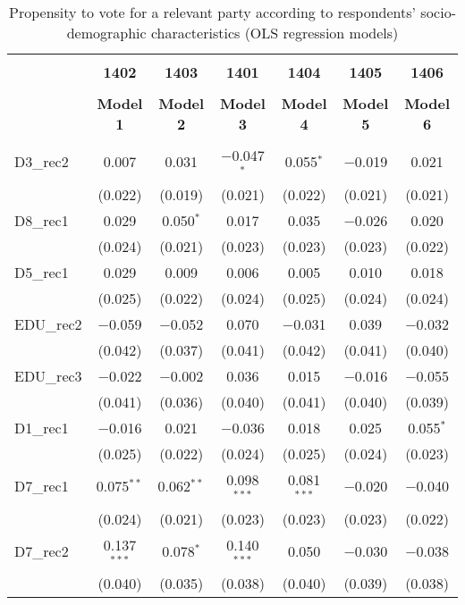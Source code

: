 \documentclass[
]{article}
\begin{document}
\begin{table}[!htbp] \centering 
  \caption{Propensity to vote for a relevant party according to respondents' 
                     socio-demographic characteristics (OLS regression models)} 
  \label{table:full_ols_ie} 
\begin{tabular}{@{\extracolsep{5pt}}lcccccc} 
\\[-1.8ex]\hline \\[-1.8ex] 
 & \textbf{1402} & \textbf{1403} & \textbf{1401} & \textbf{1404} & \textbf{1405} & \textbf{1406} \\ 
\\[-1.8ex] & \textbf{Model 1} & \textbf{Model 2} & \textbf{Model 3} & \textbf{Model 4} & \textbf{Model 5} & \textbf{Model 6}\\ 
\hline \\[-1.8ex] 
 D3\_rec2 & 0.007 & 0.031 & $-$0.047$^{*}$ & 0.055$^{*}$ & $-$0.019 & 0.021 \\ 
  & (0.022) & (0.019) & (0.021) & (0.022) & (0.021) & (0.021) \\ 
  D8\_rec1 & 0.029 & 0.050$^{*}$ & 0.017 & 0.035 & $-$0.026 & 0.020 \\ 
  & (0.024) & (0.021) & (0.023) & (0.023) & (0.023) & (0.022) \\ 
  D5\_rec1 & 0.029 & 0.009 & 0.006 & 0.005 & 0.010 & 0.018 \\ 
  & (0.025) & (0.022) & (0.024) & (0.025) & (0.024) & (0.024) \\ 
  EDU\_rec2 & $-$0.059 & $-$0.052 & 0.070 & $-$0.031 & 0.039 & $-$0.032 \\ 
  & (0.042) & (0.037) & (0.041) & (0.042) & (0.041) & (0.040) \\ 
  EDU\_rec3 & $-$0.022 & $-$0.002 & 0.036 & 0.015 & $-$0.016 & $-$0.055 \\ 
  & (0.041) & (0.036) & (0.040) & (0.041) & (0.040) & (0.039) \\ 
  D1\_rec1 & $-$0.016 & 0.021 & $-$0.036 & 0.018 & 0.025 & 0.055$^{*}$ \\ 
  & (0.025) & (0.022) & (0.024) & (0.025) & (0.024) & (0.023) \\ 
  D7\_rec1 & 0.075$^{**}$ & 0.062$^{**}$ & 0.098$^{***}$ & 0.081$^{***}$ & $-$0.020 & $-$0.040 \\ 
  & (0.024) & (0.021) & (0.023) & (0.023) & (0.023) & (0.022) \\ 
  D7\_rec2 & 0.137$^{***}$ & 0.078$^{*}$ & 0.140$^{***}$ & 0.050 & $-$0.030 & $-$0.038 \\ 
  & (0.040) & (0.035) & (0.038) & (0.040) & (0.039) & (0.038) \\ 

\end{tabular}
\end{table}
\end{document}
